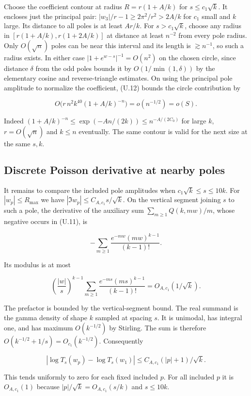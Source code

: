 \documentclass[11pt]{article}
\begin{document}
Choose the coefficient contour at radius $R=r(1+A/k)$ for $s\le c_1\sqrt k$. It encloses just the principal pair: $|w_3|/r-1\ge2\pi^2/r^2>2A/k$ for $c_1$ small and $k$ large. Its distance to all poles is at least $Ar/k$. For $s>c_1\sqrt k$, choose any radius in $[r(1+A/k),r(1+2A/k)]$ at distance at least $n^{-2}$ from every pole radius. Only $O(\sqrt n)$ poles can be near this interval and its length is $\gtrsim n^{-1}$, so such a radius exists. In either case $|1+e^{w-s}|^{-1}=O(n^2)$ on the chosen circle, since distance $\delta$ from the odd poles bounds it by $O(1/\min(1,\delta))$ by the elementary cosine and reverse-triangle estimates. On using the principal pole amplitude to normalize the coefficient, (U.12) bounds the circle contribution by

\[
O\bigl(r\,n^2 k^{40}(1+A/k)^{-n}\bigr)=o(n^{-1/2})=o(S).
\tag{U.13}
\]

Indeed $(1+A/k)^{-n}\le\exp(-An/(2k))\le n^{-A/(2C_0)}$ for large $k$, $r=O(\sqrt n)$ and $k\le n$ eventually. The same contour is valid for the next size at the same $s,k$.

\subsection{Discrete Poisson derivative at nearby poles}

It remains to compare the included pole amplitudes when $c_1\sqrt k\le s\le10k$. For $|w_p|\le R_{\max}$ we have $|\Im w_p|\le C_{A,c_1}s/\sqrt k$. On the vertical segment joining $s$ to such a pole, the derivative of the auxiliary sum $\sum_{m\ge1}Q(k,mw)/m$, whose negative occurs in (U.11), is

\[
-\sum_{m\ge1}\frac{e^{-mw}(mw)^{k-1}}{(k-1)!}.
\]

Its modulus is at most

\[
\left(\frac{|w|}{s}\right)^{k-1}
\sum_{m\ge1}\frac{e^{-ms}(ms)^{k-1}}{(k-1)!}
=O_{A,c_1}(1/\sqrt k).
\tag{U.14}
\]

The prefactor is bounded by the vertical-segment bound. The real summand is the gamma density of shape $k$ sampled at spacing $s$. It is unimodal, has integral one, and has maximum $O(k^{-1/2})$ by Stirling. The sum is therefore $O(k^{-1/2}+1/s)=O_{c_1}(k^{-1/2})$. Consequently

\[
\left|\log T_s(w_p)-\log T_s(w_1)\right|
\le C_{A,c_1} (|p|+1)/\sqrt k .
\]

This tends uniformly to zero for each fixed included $p$. For all included $p$ it is $O_{A,c_1}(1)$ because $|p|/\sqrt k=O_{A,c_1}(s/k)$ and $s\le10k$.
\end{document}

